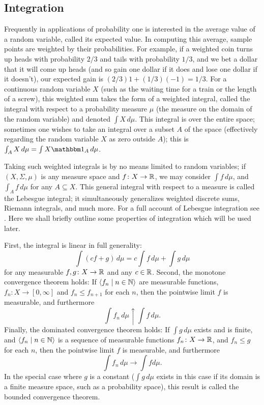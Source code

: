 \documentclass{article}
\theoremstyle{definition}
\newcommand{\bldseq}[2]{\langle{#1}\mid{#2}\rangle}
\begin{document}
\subsection{Integration}

Frequently in applications of probability one is interested in the average value of a random variable, called its expected value. In computing this average, sample points are weighted by their probabilities. For example, if a weighted coin turns up heads with probability $2/3$ and tails with probability $1/3$, and we bet a dollar that it will come up heads (and so gain one dollar if it does and lose one dollar if it doesn't), our expected gain is $(2/3)1 + (1/3)(-1) = 1/3$. For a continuous random variable $X$ (such as the waiting time for a train or the length of a screw), this weighted sum takes the form of a weighted integral, called the integral with respect to a probability measure $\mu$ (the measure on the domain of the random variable) and denoted $\int X \, d\mu$. This integral is over the entire space; sometimes one wishes to take an integral over a subset $A$ of the space (effectively regarding the random variable $X$ as zero outside $A$); this is $\int_A X \, d\mu = \int X \mathbbm 1_A \, d\mu$.

Taking such weighted integrals is by no means limited to random variables; if $(X, \Sigma, \mu)$ is any measure space and $f\colon X \rightarrow \mathbb{R}$, we may consider $\int f \, d\mu$, and $\int_A f \, d\mu$ for any $A \subseteq X$. This general integral with respect to a measure is called the Lebesgue integral; it simultaneously generalizes weighted discrete sums, Riemann integrals, and much more. For a full account of Lebesgue integration see \cite{billingsley}. Here we shall briefly outline some properties of integration which will be used later.

First, the integral is linear in full generality:
\[ \int (cf + g) \, d\mu = c\int f \, d\mu + \int g \, d\mu \]
for any measurable $f,g\colon X \rightarrow \mathbb{R}$ and any $c \in \mathbb{R}$. Second, the monotone convergence theorem holds: If $\bldseq{f_n}{n \in \N}$ are measurable functions, $f_n\colon X \rightarrow [0,\infty]$ and $f_n \le f_{n+1}$ for each $n$, then the pointwise limit $f$ is measurable, and furthermore
\[ \int f_n \, d\mu \uparrow \int f \, d\mu. \]
Finally, the dominated convergence theorem holds: If $\int g \, d\mu$ exists and is finite, and $\bldseq{f_n}{n \in \N}$ is a sequence of measurable functions $f_n\colon X \rightarrow \mathbb{R}$, and $f_n \le g$ for each $n$, then the pointwise limit $f$ is measurable, and furthermore
\[ \int f_n \, d\mu \rightarrow \int f d\mu. \]
In the special case where $g$ is a constant ($\int g \, d\mu$ exists in this case if its domain is a finite measure space, such as a probability space), this result is called the bounded convergence theorem.
\end{document}
